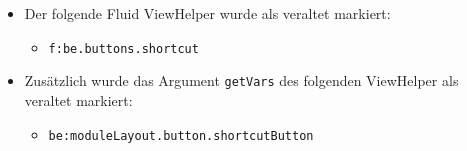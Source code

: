 \begin{frame}[fragile]
\begin{itemize}
		\item Der folgende Fluid ViewHelper wurde als veraltet markiert:

			\begin{itemize}\smaller
				\item \texttt{f:be.buttons.shortcut}
			\end{itemize}\normalsize

		\item Zusätzlich wurde das Argument \texttt{getVars} des folgenden ViewHelper
			als veraltet markiert:

			\begin{itemize}\smaller
				\item \texttt{be:moduleLayout.button.shortcutButton}
			\end{itemize}\normalsize

	\end{itemize}

\end{frame}


